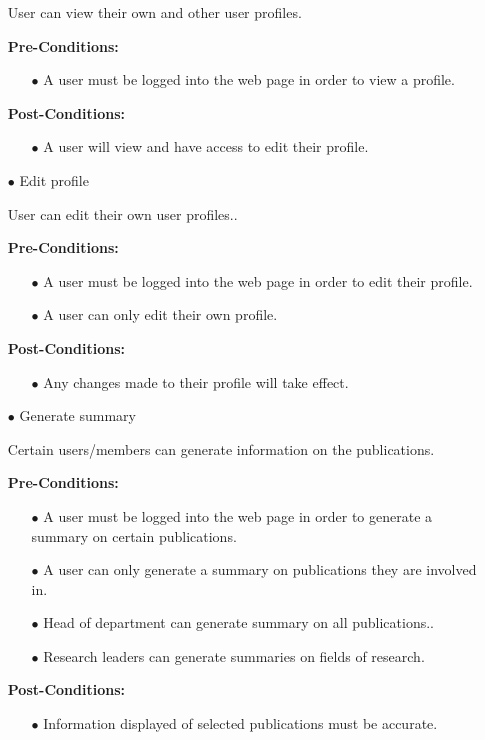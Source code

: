 \documentclass[a4paper,12pt]{article}
\begin{document}
\begin{itemize}
	User can view their own and other user profiles.

	\textbf{Pre-Conditions:}
	\begin{itemize}
		\item[$\bullet$]A user must be logged into the web page in order to view a profile.
		\\
	\end{itemize}
	\textbf{Post-Conditions: }
	\begin{itemize}
		\item[$\bullet$]A user will view and have access to edit their profile.
		\\
	\end{itemize}
	\item[$\bullet$]Edit profile

	User can edit their own user profiles..

	\textbf{Pre-Conditions:}
	\begin{itemize}
		\item[$\bullet$]A user must be logged into the web page in order to edit their profile.
		\item[$\bullet$]A user can only edit their own profile.
		\\
	\end{itemize}
	\textbf{Post-Conditions: }
	\begin{itemize}
		\item[$\bullet$]Any changes made to their profile will take effect.
		\\
	\end{itemize}
	\item[$\bullet$]Generate summary

	Certain users/members can generate information on the publications.

	\textbf{Pre-Conditions:}
	\begin{itemize}
		\item[$\bullet$]A user must be logged into the web page in order to generate a summary on certain publications.
		\item[$\bullet$]A user can only generate a summary on publications they are involved in.
		\item[$\bullet$]Head of department can generate summary on all publications..
		\item[$\bullet$]Research leaders can generate summaries on fields of research.
		\\
	\end{itemize}
	\textbf{Post-Conditions: }
	\begin{itemize}
		\item[$\bullet$]Information displayed of selected publications must be accurate.
		\\
	\end{itemize}
\end{itemize}
\end{document}
